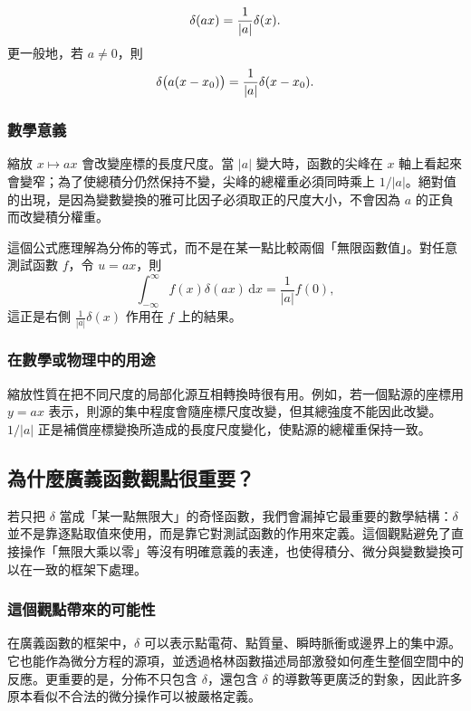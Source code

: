 \documentclass[10pt,a4paper,fontset=none]{ctexart}
\newcommand{\diff}{\,\mathrm{d}}
\begin{document}
\begin{equation}
  \delta(ax)=\frac{1}{\abs{a}}\delta(x).
\end{equation}
更一般地，若 $a\neq 0$，則
\begin{equation}
  \delta\bigl(a(x-x_0)\bigr)
  =\frac{1}{\abs{a}}\delta(x-x_0).
\end{equation}

\subsubsection{數學意義}
縮放 $x\mapsto ax$ 會改變座標的長度尺度。當 $|a|$ 變大時，函數的尖峰在 $x$ 軸上看起來會變窄；為了使總積分仍然保持不變，尖峰的總權重必須同時乘上 $1/|a|$。絕對值的出現，是因為變數變換的雅可比因子必須取正的尺度大小，不會因為 $a$ 的正負而改變積分權重。

這個公式應理解為分佈的等式，而不是在某一點比較兩個「無限函數值」。對任意測試函數 $f$，令 $u=ax$，則
\begin{equation}
  \int_{-\infty}^{\infty}f(x)\delta(ax)\diff{x}
  =\frac{1}{|a|}f(0),
\end{equation}
這正是右側 $\frac{1}{|a|}\delta(x)$ 作用在 $f$ 上的結果。

\subsubsection{在數學或物理中的用途}
縮放性質在把不同尺度的局部化源互相轉換時很有用。例如，若一個點源的座標用 $y=ax$ 表示，則源的集中程度會隨座標尺度改變，但其總強度不能因此改變。$1/|a|$ 正是補償座標變換所造成的長度尺度變化，使點源的總權重保持一致。

\subsection{為什麼廣義函數觀點很重要？}
若只把 $\delta$ 當成「某一點無限大」的奇怪函數，我們會漏掉它最重要的數學結構：$\delta$ 並不是靠逐點取值來使用，而是靠它對測試函數的作用來定義。這個觀點避免了直接操作「無限大乘以零」等沒有明確意義的表達，也使得積分、微分與變數變換可以在一致的框架下處理。

\subsubsection{這個觀點帶來的可能性}
在廣義函數的框架中，$\delta$ 可以表示點電荷、點質量、瞬時脈衝或邊界上的集中源。它也能作為微分方程的源項，並透過格林函數描述局部激發如何產生整個空間中的反應。更重要的是，分佈不只包含 $\delta$，還包含 $\delta$ 的導數等更廣泛的對象，因此許多原本看似不合法的微分操作可以被嚴格定義。
\end{document}
